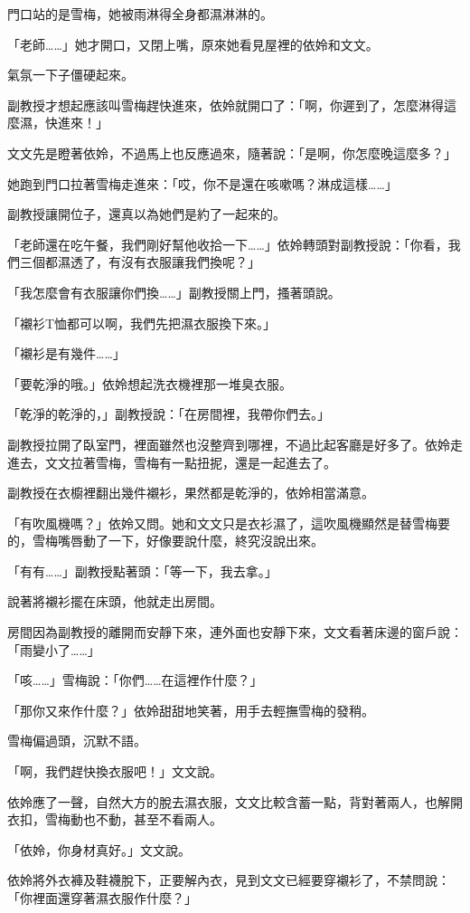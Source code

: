 門口站的是雪梅，她被雨淋得全身都濕淋淋的。

「老師……」她才開口，又閉上嘴，原來她看見屋裡的依姈和文文。

氣氛一下子僵硬起來。

副教授才想起應該叫雪梅趕快進來，依姈就開口了：「啊，你遲到了，怎麼淋得這麼濕，快進來！」

文文先是瞪著依姈，不過馬上也反應過來，隨著說：「是啊，你怎麼晚這麼多？」

她跑到門口拉著雪梅走進來：「哎，你不是還在咳嗽嗎？淋成這樣……」

副教授讓開位子，還真以為她們是約了一起來的。

「老師還在吃午餐，我們剛好幫他收拾一下……」依姈轉頭對副教授說：「你看，我們三個都濕透了，有沒有衣服讓我們換呢？」

「我怎麼會有衣服讓你們換……」副教授關上門，搔著頭說。

「襯衫T恤都可以啊，我們先把濕衣服換下來。」

「襯衫是有幾件……」

「要乾淨的哦。」依姈想起洗衣機裡那一堆臭衣服。

「乾淨的乾淨的，」副教授說：「在房間裡，我帶你們去。」

副教授拉開了臥室門，裡面雖然也沒整齊到哪裡，不過比起客廳是好多了。依姈走進去，文文拉著雪梅，雪梅有一點扭抳，還是一起進去了。

副教授在衣櫥裡翻出幾件襯衫，果然都是乾淨的，依姈相當滿意。

「有吹風機嗎？」依姈又問。她和文文只是衣衫濕了，這吹風機顯然是替雪梅要的，雪梅嘴唇動了一下，好像要說什麼，終究沒說出來。

「有有……」副教授點著頭：「等一下，我去拿。」

說著將襯衫擺在床頭，他就走出房間。

房間因為副教授的離開而安靜下來，連外面也安靜下來，文文看著床邊的窗戶說：「雨變小了……」

「咳……」雪梅說：「你們……在這裡作什麼？」

「那你又來作什麼？」依姈甜甜地笑著，用手去輕撫雪梅的發稍。

雪梅偏過頭，沉默不語。

「啊，我們趕快換衣服吧！」文文說。

依姈應了一聲，自然大方的脫去濕衣服，文文比較含蓄一點，背對著兩人，也解開衣扣，雪梅動也不動，甚至不看兩人。

「依姈，你身材真好。」文文說。

依姈將外衣褲及鞋襪脫下，正要解內衣，見到文文已經要穿襯衫了，不禁問說：「你裡面還穿著濕衣服作什麼？」

